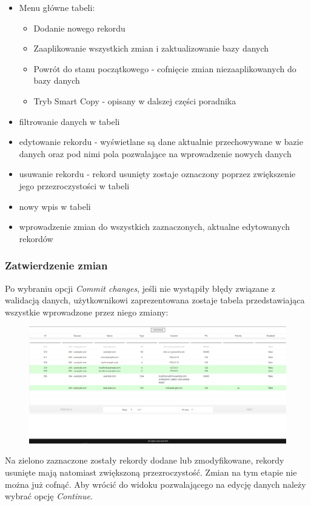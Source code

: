 \documentclass[12pt] {article}
\begin{document}
\begin{itemize}
\item \color{darkbrown} Menu główne tabeli:
\begin{itemize}
\item Dodanie nowego rekordu
\item Zaaplikowanie wszystkich zmian i zaktualizowanie bazy danych
\item Powrót do stanu początkowego - cofnięcie zmian niezaaplikowanych do bazy danych
\item Tryb Smart Copy - opisany w dalszej części poradnika
\end{itemize} \color{black}
\item \color{orange} filtrowanie danych w tabeli \color{black}
\item \color{ao} edytowanie rekordu - wyświetlane są dane aktualnie przechowywane w bazie danych oraz pod nimi pola pozwalające na wprowadzenie nowych danych \color{black}
\item \color{red} usuwanie rekordu - rekord usunięty zostaje oznaczony poprzez zwiększenie jego przezroczystości w tabeli \color{black}
\item \color{forestgreen(web)} nowy wpis w tabeli \color{black}
\item \color{black} wprowadzenie zmian do wszystkich zaznaczonych, aktualne edytowanych rekordów
\end{itemize}


\subsubsection{Zatwierdzenie zmian}
Po wybraniu opcji \emph{Commit changes}, jeśli nie wystąpiły błędy związane z walidacją danych, użytkownikowi zaprezentowana zostaje tabela przedstawiająca wszystkie wprowadzone przez niego zmiany:
\begin{figure}[H]
\centering
\includegraphics[width=\textwidth]{res/x_tabela_commit}
\end{figure} 
Na zielono zaznaczone zostały rekordy dodane lub zmodyfikowane, rekordy usunięte mają natomiast zwiększoną przezroczystość. Zmian na tym etapie nie można już cofnąć. Aby wrócić do widoku pozwalającego na edycję danych należy wybrać opcję \emph{Continue}.
\end{document}
